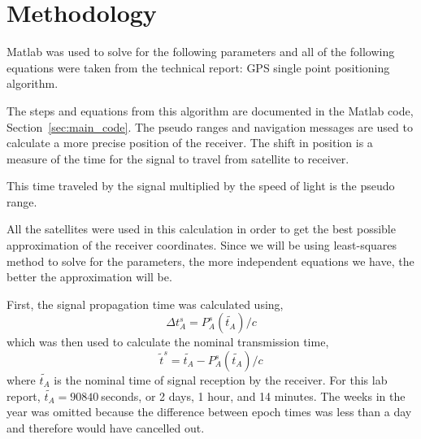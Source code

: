 
\section{Methodology} 

\label{sec:methodology}

Matlab was used to solve for the following parameters and all of the following equations were taken from the technical report: GPS single point positioning algorithm.\cite{milanGPS} 

The steps and equations from this algorithm are documented in the Matlab code, Section~\ref{sec:main_code}. The pseudo ranges and navigation messages are used to calculate a more precise position of the receiver. The shift in position is a measure of the time for the signal to travel from satellite to receiver. 

This time traveled by the signal multiplied by the speed of light is the pseudo range. 

All the satellites were used in this calculation in order to get the best possible approximation of the receiver coordinates. Since we will be using least-squares method to solve for the parameters, the more independent equations we have, the better the approximation will be. 

First, the signal propagation time was calculated using, 
\begin{equation*}
	\Delta t_A^s = P_A^s(\tilde{t_A})/c 
\end{equation*}
which was then used to calculate the nominal transmission time, 
\begin{equation*}
	\tilde{t}^s = \tilde{t_A} - P_A^s(\tilde{t_A})/c 
\end{equation*}
where $\tilde{t_A}$ is the nominal time of signal reception by the receiver. For this lab report, $\tilde{t_A}=90840~$seconds, or 2 days, 1 hour, and 14 minutes. The weeks in the year was omitted because the difference between epoch times was less than a day and therefore would have cancelled out.

